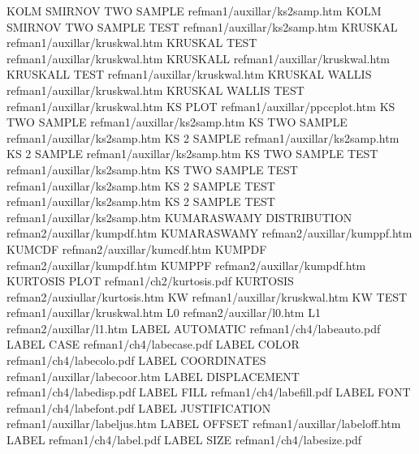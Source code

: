 KOLM SMIRNOV TWO SAMPLE                 refman1/auxillar/ks2samp.htm
KOLM SMIRNOV TWO SAMPLE TEST            refman1/auxillar/ks2samp.htm
KRUSKAL                                 refman1/auxillar/kruskwal.htm
KRUSKAL TEST                            refman1/auxillar/kruskwal.htm
KRUSKALL                                refman1/auxillar/kruskwal.htm
KRUSKALL TEST                           refman1/auxillar/kruskwal.htm
KRUSKAL WALLIS                          refman1/auxillar/kruskwal.htm
KRUSKAL WALLIS TEST                     refman1/auxillar/kruskwal.htm
KS PLOT                                 refman1/auxillar/ppccplot.htm
KS TWO SAMPLE                           refman1/auxillar/ks2samp.htm
KS TWO SAMPLE                           refman1/auxillar/ks2samp.htm
KS 2 SAMPLE                             refman1/auxillar/ks2samp.htm
KS 2 SAMPLE                             refman1/auxillar/ks2samp.htm
KS TWO SAMPLE TEST                      refman1/auxillar/ks2samp.htm
KS TWO SAMPLE TEST                      refman1/auxillar/ks2samp.htm
KS 2 SAMPLE TEST                        refman1/auxillar/ks2samp.htm
KS 2 SAMPLE TEST                        refman1/auxillar/ks2samp.htm
KUMARASWAMY DISTRIBUTION                refman2/auxillar/kumpdf.htm
KUMARASWAMY                             refman2/auxillar/kumppf.htm
KUMCDF                                  refman2/auxillar/kumcdf.htm
KUMPDF                                  refman2/auxillar/kumpdf.htm
KUMPPF                                  refman2/auxillar/kumpdf.htm
KURTOSIS PLOT                           refman1/ch2/kurtosis.pdf
KURTOSIS                                refman2/auxiullar/kurtosis.htm
KW                                      refman1/auxillar/kruskwal.htm
KW TEST                                 refman1/auxillar/kruskwal.htm
L0                                      refman2/auxillar/l0.htm
L1                                      refman2/auxillar/l1.htm
LABEL AUTOMATIC                         refman1/ch4/labeauto.pdf
LABEL CASE                              refman1/ch4/labecase.pdf
LABEL COLOR                             refman1/ch4/labecolo.pdf
LABEL COORDINATES                       refman1/auxillar/labecoor.htm
LABEL DISPLACEMENT                      refman1/ch4/labedisp.pdf
LABEL FILL                              refman1/ch4/labefill.pdf
LABEL FONT                              refman1/ch4/labefont.pdf
LABEL JUSTIFICATION                     refman1/auxillar/labeljus.htm
LABEL OFFSET                            refman1/auxillar/labeloff.htm
LABEL                                   refman1/ch4/label.pdf
LABEL SIZE                              refman1/ch4/labesize.pdf

